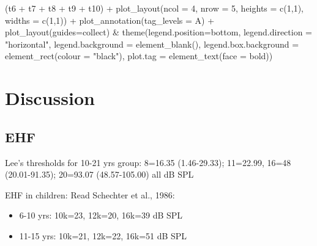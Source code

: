 \documentclass[a4paper, twoside]{templates/ociamthesis}
\newenvironment{Shaded}{\begin{snugshade}}{\end{snugshade}}
\newcommand{\AttributeTok}[1]{\textcolor[rgb]{0.77,0.63,0.00}{#1}}
\newcommand{\DecValTok}[1]{\textcolor[rgb]{0.00,0.00,0.81}{#1}}
\newcommand{\FunctionTok}[1]{\textcolor[rgb]{0.00,0.00,0.00}{#1}}
\newcommand{\NormalTok}[1]{#1}
\newcommand{\SpecialCharTok}[1]{\textcolor[rgb]{0.00,0.00,0.00}{#1}}
\newcommand{\StringTok}[1]{\textcolor[rgb]{0.31,0.60,0.02}{#1}}
\renewenvironment{Shaded}
{
  \vspace{4pt}%
  \begin{snugshade}%
}{%
  \end{snugshade}%
  \vspace{4pt}%
}
\begin{document}
\begin{Shaded}
\begin{Highlighting}[]
\NormalTok{(t6 }\SpecialCharTok{+}\NormalTok{ t7 }\SpecialCharTok{+}\NormalTok{ t8 }\SpecialCharTok{+}\NormalTok{ t9 }\SpecialCharTok{+}\NormalTok{ t10) }\SpecialCharTok{+} \FunctionTok{plot\_layout}\NormalTok{(}\AttributeTok{ncol =} \DecValTok{4}\NormalTok{, }\AttributeTok{nrow =} \DecValTok{5}\NormalTok{, }\AttributeTok{heights =} \FunctionTok{c}\NormalTok{(}\DecValTok{1}\NormalTok{,}\DecValTok{1}\NormalTok{), }\AttributeTok{widths =} \FunctionTok{c}\NormalTok{(}\DecValTok{1}\NormalTok{,}\DecValTok{1}\NormalTok{)) }\SpecialCharTok{+} \FunctionTok{plot\_annotation}\NormalTok{(}\AttributeTok{tag\_levels =} \StringTok{\textquotesingle{}A\textquotesingle{}}\NormalTok{) }\SpecialCharTok{+} \FunctionTok{plot\_layout}\NormalTok{(}\AttributeTok{guides=}\StringTok{\textquotesingle{}collect\textquotesingle{}}\NormalTok{) }\SpecialCharTok{\&}
  \FunctionTok{theme}\NormalTok{(}\AttributeTok{legend.position=}\StringTok{\textquotesingle{}bottom\textquotesingle{}}\NormalTok{,        }
        \AttributeTok{legend.direction =} \StringTok{"horizontal"}\NormalTok{,}
        \AttributeTok{legend.background =} \FunctionTok{element\_blank}\NormalTok{(),}
        \AttributeTok{legend.box.background =} \FunctionTok{element\_rect}\NormalTok{(}\AttributeTok{colour =} \StringTok{"black"}\NormalTok{),}
        \AttributeTok{plot.tag =} \FunctionTok{element\_text}\NormalTok{(}\AttributeTok{face =} \StringTok{\textquotesingle{}bold\textquotesingle{}}\NormalTok{))}
\end{Highlighting}
\end{Shaded}

\newpage

\hypertarget{discussion-4}{%
\section{Discussion}\label{discussion-4}}

\hypertarget{ehf}{%
\subsection{EHF}\label{ehf}}

Lee's thresholds for 10-21 yrs group: 8=16.35 (1.46-29.33); 11=22.99, 16=48 (20.01-91.35); 20=93.07 (48.57-105.00) all dB SPL

EHF in children: Read Schechter et al., 1986:

\begin{itemize}
\item
  6-10 yrs: 10k=23, 12k=20, 16k=39 dB SPL
\item
  11-15 yrs: 10k=21, 12k=22, 16k=51 dB SPL
\end{itemize}
\end{document}
